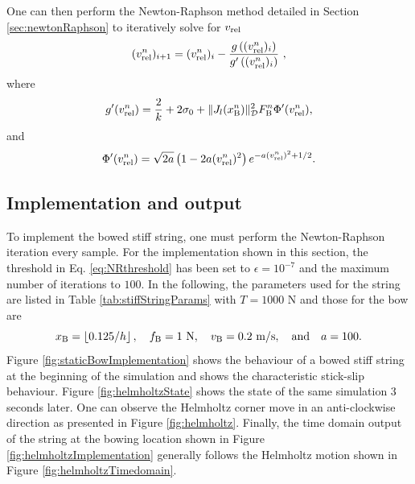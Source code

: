 One can then perform the Newton-Raphson method detailed in Section \ref{sec:newtonRaphson} to iteratively solve for $v_\text{rel}$ 
%
\begin{equation}
    (v_\text{rel}^n)_{i+1} = (v_\text{rel}^n)_i - \frac{g\left((v_\text{rel}^n)_i\right)}{g'\left((v_\text{rel}^n)_i\right)}\ ,
\end{equation}
where
\begin{equation*}
    g'(v_\text{rel}^n) = \frac{2}{k} + 2\sigma_{0} + \lVert J_l(x_{\text{B}}^n)\rVert^2_{\mathcal{D}} F_{\text{B}}^n\Phi'(v_\text{rel}^n),
\end{equation*}
and 
\begin{equation*}
    \begin{aligned}
        \Phi'(\vrel^n) %
        = \sqrt{2a}\left(1 - 2a(\vrel^n)^2\right)e^{-a(\vrel^n)^2+1/2}.
    \end{aligned}
\end{equation*}
\subsection{Implementation and output}\label{sec:staticImplementation}
To implement the bowed stiff string, one must perform the Newton-Raphson iteration every sample. For the implementation shown in this section, the threshold in Eq. \eqref{eq:NRthreshold} has been set to $\epsilon = 10^{-7}$ and the maximum number of iterations to $100$. In the following, the parameters used for the string are listed in Table \ref{tab:stiffStringParams} with $T = 1000$ N and those for the bow are
\begin{equation*}
    x_\Btxt = \floor[0.125/h],\quad f_\Btxt = 1\ \text{N},\quad v_\Btxt = 0.2\  \text{m/s},\qaq a = 100.
\end{equation*}
Figure \ref{fig:staticBowImplementation} shows the behaviour of a bowed stiff string at the beginning of the simulation and shows the characteristic stick-slip behaviour. Figure \ref{fig:helmholtzState} shows the state of the same simulation 3 seconds later. One can observe the Helmholtz corner move in an anti-clockwise direction as presented in Figure \ref{fig:helmholtz}. Finally, the time domain output of the string at the bowing location shown in Figure \ref{fig:helmholtzImplementation} generally follows the Helmholtz motion shown in Figure \ref{fig:helmholtzTimedomain}. 


